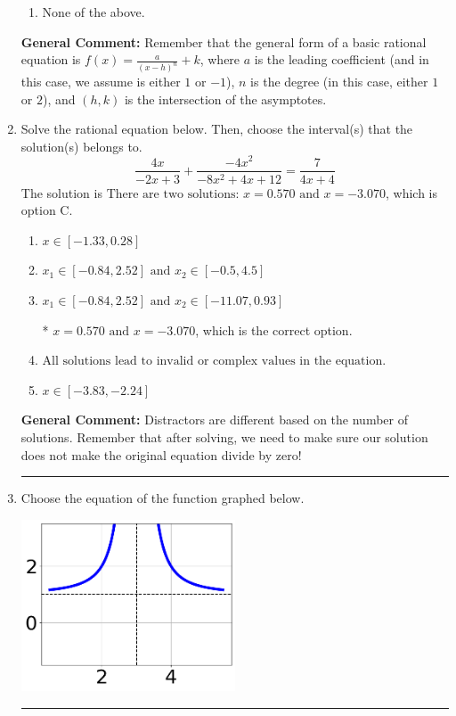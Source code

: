 \documentclass{extbook}[14pt]
\newcommand{\litem}[1]{\item #1

\rule{\textwidth}{0.4pt}}
\begin{document}
\begin{enumerate}
{\begin{enumerate}[label=\Alph*.]
\item None of the above.\end{enumerate}
\textbf{General Comment:} Remember that the general form of a basic rational equation is $ f(x) = \frac{a}{(x-h)^n} + k$, where $a$ is the leading coefficient (and in this case, we assume is either $1$ or $-1$), $n$ is the degree (in this case, either $1$ or $2$), and $(h, k)$ is the intersection of the asymptotes.
}
\litem{
Solve the rational equation below. Then, choose the interval(s) that the solution(s) belongs to.
\[ \frac{4x}{-2x + 3} + \frac{-4x^{2}}{-8x^{2} +4 x + 12} = \frac{7}{4x + 4} \]The solution is \( \text{There are two solutions: } x = 0.570 \text{ and } x = -3.070 \), which is option C.\begin{enumerate}[label=\Alph*.]
\item \( x \in [-1.33,0.28] \)


\item \( x_1 \in [-0.84, 2.52] \text{ and } x_2 \in [-0.5,4.5] \)


\item \( x_1 \in [-0.84, 2.52] \text{ and } x_2 \in [-11.07,0.93] \)

* $x = 0.570 \text{ and } x = -3.070$, which is the correct option.
\item \( \text{All solutions lead to invalid or complex values in the equation.} \)


\item \( x \in [-3.83,-2.24] \)


\end{enumerate}

\textbf{General Comment:} Distractors are different based on the number of solutions. Remember that after solving, we need to make sure our solution does not make the original equation divide by zero!
}
\litem{
Choose the equation of the function graphed below.

\begin{center}
    \includegraphics[width=0.5\textwidth]{../Figures/rationalGraphToEquationA.png}
\end{center}


}
\end{enumerate}
\end{document}
